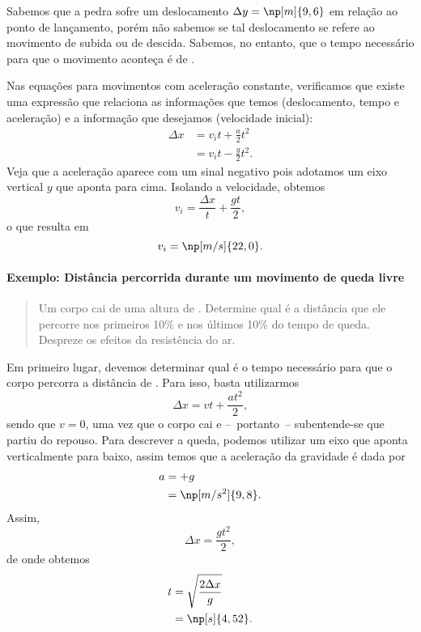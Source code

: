 Sabemos que a pedra sofre um deslocamento $\Delta y = \np[m]{9,6}$ em relação ao ponto de lançamento, porém não sabemos se tal deslocamento se refere ao movimento de subida ou de descida. Sabemos, no entanto, que o tempo necessário para que o movimento aconteça é de .

Nas equações para movimentos com aceleração constante, verificamos que existe uma expressão que relaciona as informações que temos (deslocamento, tempo e aceleração) e a informação que desejamos (velocidade inicial):
\begin{align}
    \Delta x &= v_i t + \frac{a}{2}t^2 \\
    &= v_i t - \frac{g}{2}t^2.
\end{align}
%
Veja que a aceleração aparece com um sinal negativo pois adotamos um eixo vertical $y$ que aponta para cima. Isolando a velocidade, obtemos
\begin{equation}
    v_i = \frac{\Delta x}{t} + \frac{gt}{2},
\end{equation}
%
o que resulta em
\begin{equation}
    v_i = \np[m/s]{22,0}.
\end{equation}

\paragraph{Exemplo: Distância percorrida durante um movimento de queda livre}

\begin{quote}
	Um corpo cai de uma altura de . Determine qual é a distância que ele percorre nos primeiros 10\% e nos últimos 10\% do tempo de queda. Despreze os efeitos da resistência do ar.
\end{quote}

Em primeiro lugar, devemos determinar qual é o tempo necessário para que o corpo percorra a distância de . Para isso, basta utilizarmos
\begin{equation}
	\Delta x = vt + \frac{at^2}{2},
\end{equation}
%
sendo que $v = 0$, uma vez que o corpo cai e --~portanto~-- subentende-se que partiu do repouso. Para descrever a queda, podemos utilizar um eixo que aponta verticalmente para baixo, assim temos que a aceleração da gravidade é dada por
\begin{align}
	a &= +g \\
	&= \np[m/s^2]{9,8}.
\end{align}
%
Assim,
\begin{equation}
	\Delta x = \frac{gt^2}{2},
\end{equation}
%
de onde obtemos
\begin{align}
	t &= \sqrt{\frac{2 \Delta x}{g}} \\
	&= \np[s]{4,52}.
\end{align}

